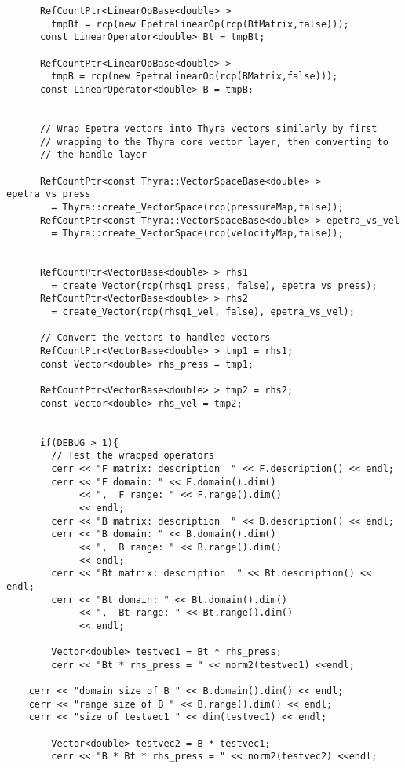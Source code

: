 \begin{verbatim}
      RefCountPtr<LinearOpBase<double> >
        tmpBt = rcp(new EpetraLinearOp(rcp(BtMatrix,false)));
      const LinearOperator<double> Bt = tmpBt;

      RefCountPtr<LinearOpBase<double> >
        tmpB = rcp(new EpetraLinearOp(rcp(BMatrix,false)));
      const LinearOperator<double> B = tmpB;


      // Wrap Epetra vectors into Thyra vectors similarly by first
      // wrapping to the Thyra core vector layer, then converting to
      // the handle layer

      RefCountPtr<const Thyra::VectorSpaceBase<double> > epetra_vs_press
        = Thyra::create_VectorSpace(rcp(pressureMap,false));
      RefCountPtr<const Thyra::VectorSpaceBase<double> > epetra_vs_vel
        = Thyra::create_VectorSpace(rcp(velocityMap,false));


      RefCountPtr<VectorBase<double> > rhs1
        = create_Vector(rcp(rhsq1_press, false), epetra_vs_press);
      RefCountPtr<VectorBase<double> > rhs2
        = create_Vector(rcp(rhsq1_vel, false), epetra_vs_vel);

      // Convert the vectors to handled vectors
      RefCountPtr<VectorBase<double> > tmp1 = rhs1;
      const Vector<double> rhs_press = tmp1;

      RefCountPtr<VectorBase<double> > tmp2 = rhs2;
      const Vector<double> rhs_vel = tmp2;


      if(DEBUG > 1){
        // Test the wrapped operators
        cerr << "F matrix: description  " << F.description() << endl;
        cerr << "F domain: " << F.domain().dim() 
             << ",  F range: " << F.range().dim() 
             << endl;
        cerr << "B matrix: description  " << B.description() << endl;
        cerr << "B domain: " << B.domain().dim() 
             << ",  B range: " << B.range().dim() 
             << endl;
        cerr << "Bt matrix: description  " << Bt.description() << endl;
        cerr << "Bt domain: " << Bt.domain().dim() 
             << ",  Bt range: " << Bt.range().dim() 
             << endl;

        Vector<double> testvec1 = Bt * rhs_press;
        cerr << "Bt * rhs_press = " << norm2(testvec1) <<endl;

	cerr << "domain size of B " << B.domain().dim() << endl;
	cerr << "range size of B " << B.range().dim() << endl;
	cerr << "size of testvec1 " << dim(testvec1) << endl;

        Vector<double> testvec2 = B * testvec1;
        cerr << "B * Bt * rhs_press = " << norm2(testvec2) <<endl;


\end{verbatim}
